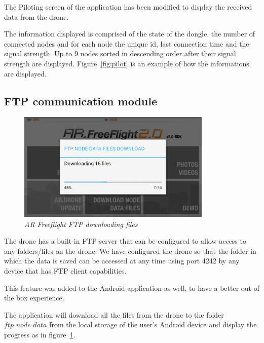 The Piloting screen of the application has been modified to display the received data from the drone.

The information displayed is comprised of the state of the dongle, the number of connected nodes and for each node the unique id, last connection time and the signal strength. Up to 9 nodes sorted in descending order after their signal strength are displayed. Figure~\ref{fig:pilot} is an example of how the informations are displayed.

\subsection{FTP communication module}

\begin{figure}[ht]
\begin{center}
\includegraphics[width=0.825\textwidth]{img/android_ftp.png}
\end{center}
\caption{\small \itshape{AR Freeflight FTP downloading files}}
  \label{fig:ftp}
\end{figure}

The drone has a built-in FTP server that can be configured to allow access to any folders/files on the drone. We have configured the drone so that the folder in which the data is saved can be accessed at any time using port 4242 by any device that has FTP client capabilities.

This feature was added to the Android application as well, to have a better out of the box experience.

The application will download all the files from the drone to the folder $ftp\_node\_data$ from the local storage of the user's Android device and display the progress as in figure~\ref{fig:ftp}.

